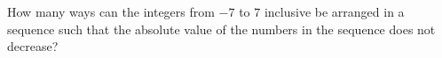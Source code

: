 How many ways can the integers from $-7$ to $7$ inclusive be arranged in a sequence such that the absolute value of the numbers in the sequence does not decrease?